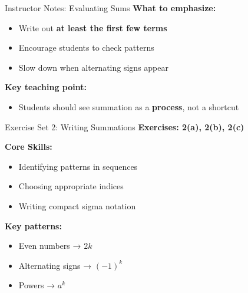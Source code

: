 \documentclass[dvipsnames]{beamer}
\begin{document}

\begin{frame}{Instructor Notes: Evaluating Sums}
\textbf{What to emphasize:}
\begin{itemize}
\item Write out \textbf{at least the first few terms}
\item Encourage students to check patterns
\item Slow down when alternating signs appear
\end{itemize}

\vspace{1em}

\textbf{Key teaching point:}
\begin{itemize}
\item Students should see summation as a \textbf{process}, not a shortcut
\end{itemize}
\end{frame}


\begin{frame}{Exercise Set 2: Writing Summations}
\textbf{Exercises: 2(a), 2(b), 2(c)}

\vspace{1em}

\textbf{Core Skills:}
\begin{itemize}
\item Identifying patterns in sequences
\item Choosing appropriate indices
\item Writing compact sigma notation
\end{itemize}

\vspace{1em}

\textbf{Key patterns:}
\begin{itemize}
\item Even numbers → $2k$
\item Alternating signs → $(-1)^k$
\item Powers → $a^k$
\end{itemize}
\end{frame}

\end{document}
